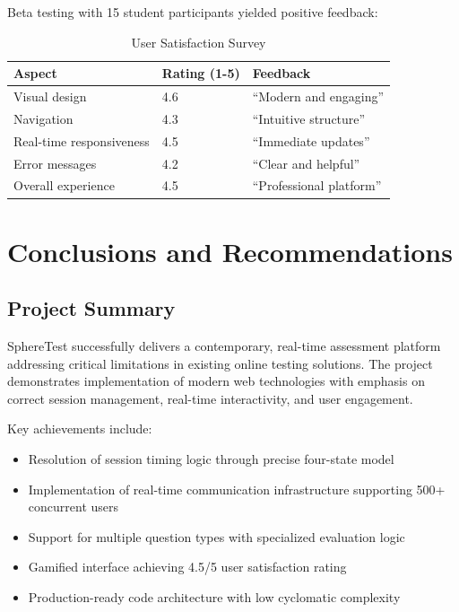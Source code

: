 \documentclass[12pt,a4paper]{report}
\newcommand{\rA}{\rowcolor{white}}
\newcommand{\rB}{\rowcolor{lightgray}}
\newcommand{\rH}{\rowcolor{headcol}}
\begin{document}
Beta testing with 15 student participants yielded positive feedback:

\begin{table}[H]
  \centering
  \small
  \begin{tabular}{|l|l|l|}
    \hline
    \rH \textbf{Aspect} & \textbf{Rating (1-5)} & \textbf{Feedback} \\
    \hline
    \rA Visual design & 4.6 & ``Modern and engaging'' \\
    \hline
    \rB Navigation & 4.3 & ``Intuitive structure'' \\
    \hline
    \rA Real-time responsiveness & 4.5 & ``Immediate updates'' \\
    \hline
    \rB Error messages & 4.2 & ``Clear and helpful'' \\
    \hline
    \rA Overall experience & 4.5 & ``Professional platform'' \\
    \hline
  \end{tabular}
  \caption{User Satisfaction Survey}
\end{table}

\cleardoublepage


\chapter{Conclusions and Recommendations}

\section{Project Summary}

SphereTest successfully delivers a contemporary, real-time assessment platform addressing critical limitations in existing online testing solutions. The project demonstrates implementation of modern web technologies with emphasis on correct session management, real-time interactivity, and user engagement.

Key achievements include:

\begin{itemize}[left=0pt]
  \item Resolution of session timing logic through precise four-state model
  \item Implementation of real-time communication infrastructure supporting 500+ concurrent users
  \item Support for multiple question types with specialized evaluation logic
  \item Gamified interface achieving 4.5/5 user satisfaction rating
  \item Production-ready code architecture with low cyclomatic complexity
\end{itemize}
\end{document}
